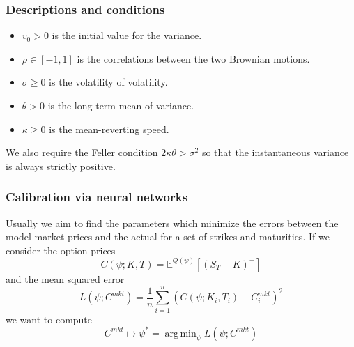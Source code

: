 \documentclass{beamer}
\theoremstyle{plain}
\theoremstyle{definition}
\theoremstyle{remark}
\newcommand{\E}{\mathbb{E}}
\DeclareMathOperator*{\argmin}{arg\,min}
\begin{document}
\begin{frame}
	\frametitle{Descriptions and conditions}
	\begin{itemize}
		\item $v_0>0$ is the initial value for the variance.
		\item $\rho\in[-1,1]$ is the correlations between the two Brownian motions.
		\item $\sigma\geq 0$ is the volatility of volatility.
		\item $\theta >0 $ is the long-term mean of variance.
		\item $\kappa\geq 0$ is the mean-reverting speed.
	\end{itemize}
	We also require the Feller condition $2\kappa\theta > \sigma^2$ so that the instantaneous variance is always strictly positive.
\end{frame}

\begin{frame}
	\frametitle{Calibration via neural networks}
	Usually we aim to find the parameters which minimize the errors between the model market prices and the actual for a set of strikes and maturities.\newline
	If we consider the option prices
	\begin{equation}
		C(\psi;K,T) = \E^{Q(\psi)}[(S_T-K)^+]
	\end{equation}
	and the mean squared error
	\begin{equation}
		L(\psi;C^{mkt})=\frac{1}{n} \sum_{i=1}^{n}(C(\psi;K_i,T_i)-C_i^{mkt})^2
	\end{equation}
	we want to compute
	\begin{equation}
		C^{mkt}\mapsto \psi^* = \argmin_\psi L(\psi;C^{mkt})
	\end{equation}
\end{frame}
\end{document}
